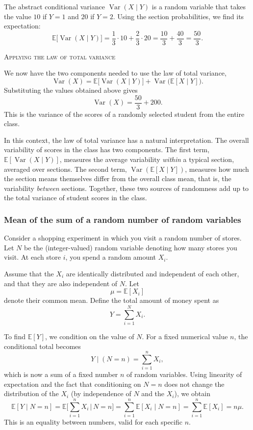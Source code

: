 The abstract conditional variance \(\operatorname{Var}(X \mid Y)\) is a random variable that takes the value \(10\) if \(Y = 1\) and \(20\) if \(Y = 2\).  
Using the section probabilities, we find its expectation:
\[
\mathbb{E}\big[\operatorname{Var}(X \mid Y)\big]
=
\frac{1}{3}\cdot 10
+
\frac{2}{3}\cdot 20
=
\frac{10}{3}
+
\frac{40}{3}
=
\frac{50}{3}.
\]

\bigskip
\textsc{Applying the law of total variance}

We now have the two components needed to use the law of total variance,
\[
\operatorname{Var}(X)
=
\mathbb{E}\big[\operatorname{Var}(X \mid Y)\big]
+
\operatorname{Var}\big(\mathbb{E}[X \mid Y]\big).
\]
Substituting the values obtained above gives
\[
\operatorname{Var}(X)
=
\frac{50}{3}
+
200.
\]
This is the variance of the scores of a randomly selected student from the entire class.

In this context, the law of total variance has a natural interpretation.  
The overall variability of scores in the class has two components.  
The first term, \(\mathbb{E}[\operatorname{Var}(X \mid Y)]\), measures the average variability \textit{within} a typical section, averaged over sections.  
The second term, \(\operatorname{Var}(\mathbb{E}[X \mid Y])\), measures how much the section means themselves differ from the overall class mean, that is, the variability \textit{between} sections.  
Together, these two sources of randomness add up to the total variance of student scores in the class.


\subsubsection{Mean of the sum of a random number of random variables}

Consider a shopping experiment in which you visit a random number of stores.  
Let \(N\) be the (integer-valued) random variable denoting how many stores you visit.  
At each store \(i\), you spend a random amount \(X_i\).  

Assume that the \(X_i\) are identically distributed and independent of each other, and that they are also independent of \(N\).  
Let
\[
\mu = \mathbb{E}[X_i]
\]
denote their common mean.  
Define the total amount of money spent as
\[
Y = \sum_{i=1}^{N} X_i.
\]

To find \(\mathbb{E}[Y]\), we condition on the value of \(N\).  
For a fixed numerical value \(n\), the conditional total becomes
\[
Y \mid (N = n)
=
\sum_{i=1}^{n} X_i,
\]
which is now a sum of a fixed number \(n\) of random variables.  
Using linearity of expectation and the fact that conditioning on \(N = n\) does not change the distribution of the \(X_i\) (by independence of \(N\) and the \(X_i\)), we obtain
\[
\mathbb{E}[Y \mid N = n]
=
\mathbb{E}\Big[\sum_{i=1}^{n} X_i \,\Big|\, N = n\Big]
=
\sum_{i=1}^{n} \mathbb{E}[X_i \mid N = n]
=
\sum_{i=1}^{n} \mathbb{E}[X_i]
=
n \mu.
\]
This is an equality between numbers, valid for each specific \(n\).

